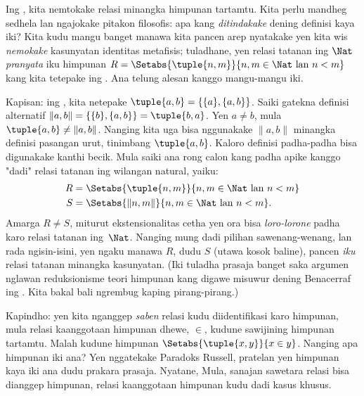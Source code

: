 \documentclass[../../../include/open-logic-section]{subfiles}
\begin{document}

Ing , kita nemtokake relasi minangka himpunan
tartamtu. Kita perlu mandheg sedhela lan ngajokake pitakon
filosofis: apa kang \emph{ditindakake} dening definisi kaya iki?
Kita kudu mangu banget manawa kita pancen arep nyatakake yen kita
wis \emph{nemokake} kasunyatan identitas metafisis; tuladhane,
yen relasi tatanan ing $\Nat$ \emph{pranyata} iku himpunan
$R=  \Setabs{\tuple{n,m}}{n, m \in \Nat\text{ lan }
n < m}$ kang kita tetepake ing .
Ana telung alesan kanggo mangu-mangu iki.

Kapisan: ing , kita netepake
$\tuple{a, b} =\{\{a\}, \{a, b\}\}$.
Saiki gatekna definisi alternatif
$\lVert a,b\rVert = \{\{b\}, \{a, b\}\} = \tuple{b,a}$.
Yen $a \neq b$, mula $\tuple{a, b} \neq \lVert a,b\rVert$.
Nanging kita uga bisa nggunakake $\lVert a,b\rVert$ minangka
definisi pasangan urut, tinimbang $\tuple{a,b}$.
Kaloro definisi padha-padha bisa digunakake kanthi becik.
Mula saiki ana rong calon kang padha apike kanggo "dadi"
relasi tatanan ing wilangan natural, yaiku:
\begin{align*}
		R &= \Setabs{\tuple{n,m}}{n, m \in \Nat \text{ lan }n < m}\\
		S &= \Setabs{\lVert n,m\rVert}{n, m \in \Nat \text{ lan }n < m}.
\end{align*}
Amarga $R \neq S$, miturut ekstensionalitas cetha yen ora
bisa \emph{loro-lorone} padha karo relasi tatanan ing~$\Nat$.
Nanging mung dadi pilihan sawenang-wenang, lan rada ngisin-isini,
yen ngaku manawa $R$, dudu $S$ (utawa kosok baline),
pancen \emph{iku} relasi tatanan minangka kasunyatan.
(Iki tuladha prasaja banget saka argumen nglawan reduksionisme
teori himpunan kang digawe misuwur dening Benacerraf ing
\citeyear{Benacerraf1965}. Kita bakal bali ngrembug kaping pirang-pirang.)

Kapindho: yen kita nganggep \emph{saben} relasi kudu
diidentifikasi karo himpunan, mula relasi kaanggotaan himpunan
dhewe, $\in$, kudune sawijining himpunan tartamtu.
Malah kudune himpunan $\Setabs{\tuple{x,y}}{x \in y}$.
Nanging apa himpunan iki ana? Yen nggatekake Paradoks Russell,
pratelan yen himpunan kaya iki ana dudu prakara prasaja.
Nyatane, 
Mula, sanajan sawetara relasi bisa dianggep himpunan,
relasi kaanggotaan himpunan kudu dadi kasus khusus.
\end{document}
